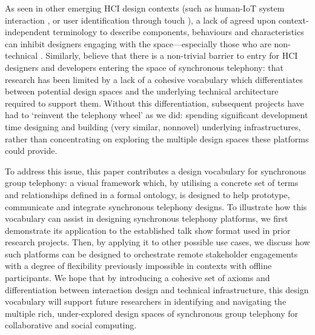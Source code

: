 As seen in other emerging HCI design contexts (such as human-IoT system interaction \cite{Chuang2018}, or user identification through touch \cite{Kharrufa2017}), a lack of agreed upon context-independent terminology to describe components, behaviours and characteristics can inhibit designers engaging with the space---especially those who are non-technical \cite{Kharrufa2017}. Similarly, believe that there is a non-trivial barrier to entry for HCI designers and developers entering the space of synchronous telephony: that research has been limited by a lack of a cohesive vocabulary which differentiates between potential design spaces and the underlying technical architecture required to support them. Without this differentiation, subsequent projects have had to `reinvent the telephony wheel' as we did: spending significant development time designing and building (very similar, nonnovel) underlying infrastructures, rather than concentrating on exploring the multiple design spaces these platforms could provide. 

To address this issue, this paper contributes a design vocabulary for synchronous group telephony: a visual framework which, by utilising a concrete set of terms and relationships defined in a formal ontology, is designed to help prototype, communicate and integrate synchronous telephony designs. To illustrate how this vocabulary can assist in designing synchronous telephony platforms, we first demonstrate its application to the established talk show format used in prior research projects. Then, by applying it to other possible use cases, we discuss how such platforms can be designed to orchestrate remote stakeholder engagements with a degree of flexibility previously impossible in contexts with offline participants. We hope that by introducing a cohesive set of axioms and differentiation between interaction design and technical infrastructure, this design vocabulary will support future researchers in identifying and navigating the multiple rich, under-explored design spaces of synchronous group telephony for collaborative and social computing.